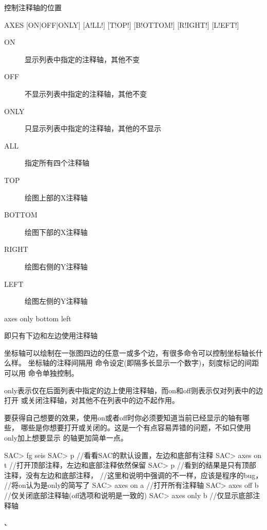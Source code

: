 \label{cmd:axes}

控制注释轴的位置

\begin{SACSTX}
AXES [ON|OFF|ONLY] [A!LL!] [T!OP!] [B!OTTOM!] [R!IGHT!] [L!EFT!]
\end{SACSTX}

\begin{description}
\item [ON] 显示列表中指定的注释轴，其他不变
\item [OFF] 不显示列表中指定的注释轴，其他不变
\item [ONLY] 只显示列表中指定的注释轴，其他的不显示
\item [ALL] 指定所有四个注释轴
\item [TOP] 绘图上部的X注释轴
\item [BOTTOM] 绘图下部的X注释轴
\item [RIGHT] 绘图右侧的Y注释轴
\item [LEFT] 绘图左侧的Y注释轴
\end{description}

\begin{SACDFT}
axes only bottom left
\end{SACDFT}
即只有下边和左边使用注释轴

坐标轴可以绘制在一张图四边的任意一或多个边，有很多命令可以控制坐标轴长什么样。
坐标轴的注释间隔用 命令设定(即隔多长显示一个数字)，刻度标记的间距可以用 命令单独控制。

only表示仅在后面列表中指定的边上使用注释轴，而on和off则表示仅对列表中的边打开
或关闭注释轴，对其他不在列表中的边不起作用。

要获得自己想要的效果，使用on或者off时你必须要知道当前已经显示的轴有哪些，
哪些是你想要打开或关闭的。这是一个有点容易弄错的问题，不如只使用only加上想要显示
的轴更加简单一点。

\begin{SACCode}
SAC> fg seis
SAC> p           //看看SAC的默认设置，左边和底部有注释
SAC> axes on t   //打开顶部注释，左边和底部注释依然保留
SAC> p           //看到的结果是只有顶部注释，没有左边和底部注释，
                 //这里和说明中强调的不一样，应该是程序的bug，
                 //将on认为是only的简写了
SAC> axes on a   //打开所有注释轴
SAC> axes off b  //仅关闭底部注释轴(off选项和说明是一致的)
SAC> axes only b //仅显示底部注释轴
\end{SACCode}

、
